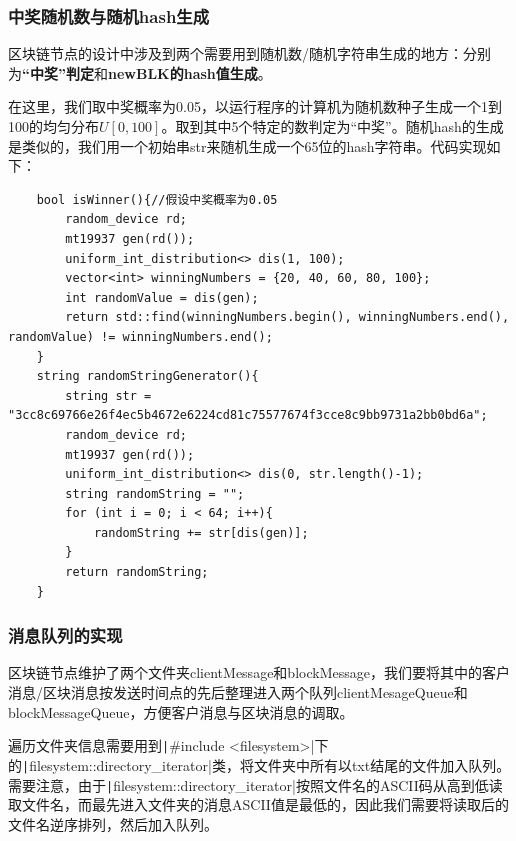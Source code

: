 \documentclass[10pt,a4paper]{article}
\begin{document}
    \subsubsection{中奖随机数与随机hash生成}
    区块链节点的设计中涉及到两个需要用到随机数/随机字符串生成的地方：分别为\textbf{“中奖”判定}和\textbf{newBLK的hash值生成}。
    
    在这里，我们取中奖概率为0.05，以运行程序的计算机为随机数种子生成一个1到100的均匀分布$U[0,100]$。取到其中5个特定的数判定为“中奖”。随机hash的生成是类似的，我们用一个初始串str来随机生成一个65位的hash字符串。代码实现如下：
    \begin{verbatim}
    bool isWinner(){//假设中奖概率为0.05
        random_device rd;
        mt19937 gen(rd());
        uniform_int_distribution<> dis(1, 100);
        vector<int> winningNumbers = {20, 40, 60, 80, 100};
        int randomValue = dis(gen);
        return std::find(winningNumbers.begin(), winningNumbers.end(), randomValue) != winningNumbers.end();
    }
    string randomStringGenerator(){
        string str = "3cc8c69766e26f4ec5b4672e6224cd81c75577674f3cce8c9bb9731a2bb0bd6a";
        random_device rd;
        mt19937 gen(rd());
        uniform_int_distribution<> dis(0, str.length()-1);
        string randomString = "";
        for (int i = 0; i < 64; i++){
            randomString += str[dis(gen)];
        }
        return randomString;
    }
    \end{verbatim}
    \subsubsection{消息队列的实现}
    区块链节点维护了两个文件夹clientMessage和blockMessage，我们要将其中的客户消息/区块消息按发送时间点的先后整理进入两个队列clientMesageQueue和blockMessageQueue，方便客户消息与区块消息的调取。
    
    遍历文件夹信息需要用到\texttt|#include <filesystem>|下的\texttt|filesystem::directory_iterator|类，将文件夹中所有以txt结尾的文件加入队列。需要注意，由于\texttt|filesystem::directory_iterator|按照文件名的ASCII码从高到低读取文件名，而最先进入文件夹的消息ASCII值是最低的，因此我们需要将读取后的文件名逆序排列，然后加入队列。
\end{document}
